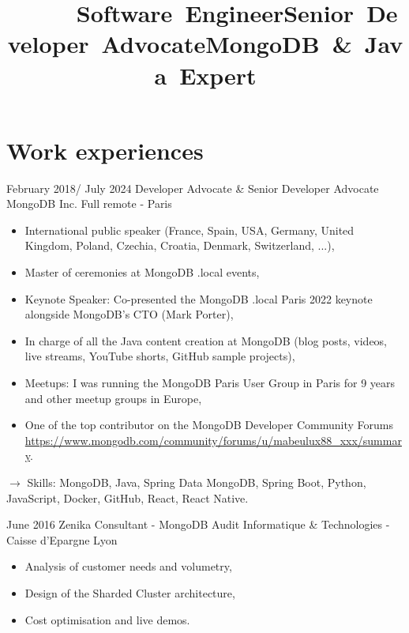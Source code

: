 \documentclass[11pt,a4paper,sans]{moderncv}
\title{\mbox{~~~~~Software Engineer}\newline\mbox{Senior Developer Advocate}\newline\mbox{MongoDB \& Java Expert}} %
\begin{document}
\maketitle

\section{Work experiences}\label{sec:work-experiences}

\cventry
{February 2018/ July 2024}
{Developer Advocate \& Senior Developer Advocate}
{MongoDB Inc.}
{Full remote - Paris}
{}
{\begin{itemize}
     \item International public speaker (France, Spain, USA, Germany, United Kingdom, Poland, Czechia, Croatia, Denmark, Switzerland, ...),
     \item Master of ceremonies at MongoDB .local events,
     \item Keynote Speaker: Co-presented the MongoDB .local Paris 2022 keynote alongside MongoDB's CTO (Mark Porter),
     \item In charge of all the Java content creation at MongoDB (blog posts, videos, live streams, YouTube shorts, GitHub sample projects),
     \item Meetups: I was running the MongoDB Paris User Group in Paris for 9 years and other meetup groups in Europe,
     \item One of the top contributor on the MongoDB Developer Community Forums \url{https://www.mongodb.com/community/forums/u/mabeulux88\_xxx/summary}.
\end{itemize}
$\rightarrow$ Skills: MongoDB, Java, Spring Data MongoDB, Spring Boot, Python, JavaScript, Docker, GitHub, React, React Native.
}   %

\cventry
{June 2016}
{Zenika Consultant - MongoDB Audit}
{Informatique \& Technologies - Caisse d'Epargne}
{Lyon}
{}
{\begin{itemize}
    \item Analysis of customer needs and volumetry,
    \item Design of the Sharded Cluster architecture,
    \item Cost optimisation and live demos.
\end{itemize}
}   %
\end{document}
